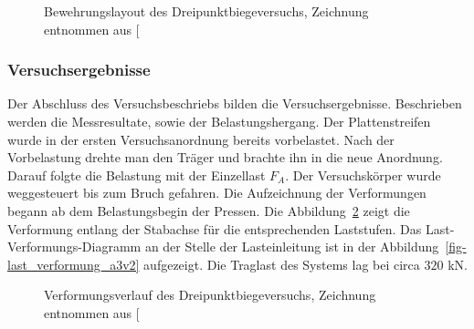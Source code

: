 \documentclass[
  11pt,
  letterpaper,
]{scrreprt}
\begin{document}
\begin{figure}[H]


\caption{\label{fig-bewehrung_a3v2}Bewehrungslayout des
Dreipunktbiegeversuchs, Zeichnung entnommen aus
{[}\citeproc{ref-jager_versuche_2006}{2}{]}}

\end{figure}%

\subsubsection{Versuchsergebnisse}\label{versuchsergebnisse}

Der Abschluss des Versuchsbeschriebs bilden die Versuchsergebnisse.
Beschrieben werden die Messresultate, sowie der Belastungshergang. Der
Plattenstreifen wurde in der ersten Versuchsanordnung bereits
vorbelastet. Nach der Vorbelastung drehte man den Träger und brachte ihn
in die neue Anordnung. Darauf folgte die Belastung mit der Einzellast
\(F_A\). Der Versuchskörper wurde weggesteuert bis zum Bruch gefahren.
Die Aufzeichnung der Verformungen begann ab dem Belastungsbegin der
Pressen. Die Abbildung~\ref{fig-verformungslinie_a3v2} zeigt die
Verformung entlang der Stabachse für die entsprechenden Laststufen. Das
Last-Verformungs-Diagramm an der Stelle der Lasteinleitung ist in der
Abbildung~\ref{fig-last_verformung_a3v2} aufgezeigt. Die Traglast des
Systems lag bei circa \(320\) kN.

\begin{figure}[H]


\caption{\label{fig-verformungslinie_a3v2}Verformungsverlauf des
Dreipunktbiegeversuchs, Zeichnung entnommen aus
{[}\citeproc{ref-jager_versuche_2006}{2}{]}}

\end{figure}%
\end{document}
